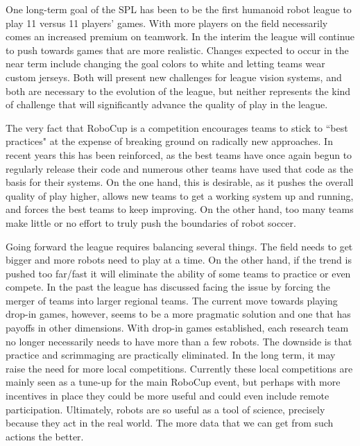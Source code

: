 \documentclass{llncs}
\begin{document}
One long-term goal
of the SPL has been to be the first humanoid robot league to play 11 versus 11 players' games.
With more players on the field necessarily comes an increased premium on teamwork.
In the interim the league will continue to push towards games that are more realistic.
Changes expected to occur in the near term include changing the goal colors to white
and letting teams wear custom jerseys. Both will present new challenges for league vision
systems, and both are necessary to the evolution of the league, but neither represents the
kind of challenge that will significantly advance the quality of play in the league. 

The very fact that RoboCup is a competition
encourages teams to stick to ``best practices" at the expense of breaking ground on
radically new approaches. In recent years this has been reinforced, as the best teams
have once again begun to regularly release their code and numerous other teams have
used that code as the basis for their systems. On the one hand, this is desirable,
as it pushes the overall quality of play higher, allows new teams to get a working
system up and running, and forces the best teams to keep improving. On the other
hand, too many teams make little or no effort to truly push the boundaries of robot
soccer. 

Going forward the league requires balancing several things. The field
needs to get bigger and more robots need to play at a time. On the other hand, if the
trend is pushed too far/fast it will eliminate the ability of some teams to practice or
even compete. In the past the league has discussed facing the issue by forcing the
merger of teams into larger regional teams. The current move towards playing drop-in
games, however, seems to be a more pragmatic solution and one that has payoffs
in other dimensions. With drop-in games established, each research team no longer necessarily needs to have more
than a few robots. The downside is that practice and scrimmaging are practically eliminated. In the long term, it may raise 
the need for more local competitions. Currently these local competitions
are mainly seen as a tune-up for the main RoboCup event, but perhaps with more incentives in place
they could be more useful and could even include remote participation. Ultimately,
robots are so useful as a tool of science, precisely because they act in the real world. The
more data that we can get from such actions the better.
\end{document}
